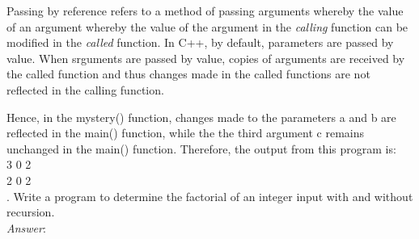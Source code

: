 \documentclass[a4paper,12pt]{article}
\begin{document}
Passing by reference refers to a method of passing arguments whereby the value of an argument whereby the value of the argument in the \emph{calling} function can be modified in the \emph{called} function. In C++, by default, parameters are passed by value. When srguments are passed by value, copies of arguments are received by the called function and thus changes made in the called functions are not reflected in the calling function.

Hence, in the mystery() function, changes made to the parameters a and b are reflected in the main() function, while the the third argument c remains unchanged in the main() function. Therefore, the output from this program is:\\
3  0  2\\
2  0  2\\

. Write a program to determine the factorial of an integer input with and without recursion.\\
\emph{Answer}:
\end{document}
